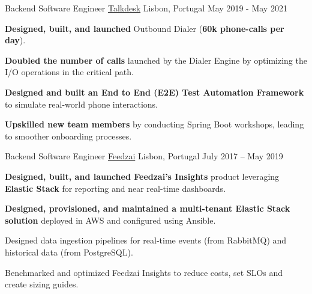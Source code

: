\begin{cventries}
  \cventry
    {Backend Software Engineer}
    {\href{https://www.talkdesk.com/}{Talkdesk}}
    {Lisbon, Portugal}
    {May 2019 - May 2021}
    {
      \begin{cvitems}
        \item \textbf{Designed, built, and launched} Outbound Dialer (\textbf{60k phone-calls per day}).
        \item \textbf{Doubled the number of calls} launched by the Dialer Engine by optimizing the I/O operations in the critical path.
        \item \textbf{Designed and built an End to End (E2E) Test Automation Framework} to simulate real-world phone interactions.
        \item \textbf{Upskilled new team members} by conducting Spring Boot workshops, leading to smoother onboarding processes.
      \end{cvitems}
      \vspace{4mm}
    }

    
  \cventry
    {Backend Software Engineer}
    {\href{https://feedzai.com/}{Feedzai}}
    {Lisbon, Portugal}
    {July 2017 – May 2019}
    {
      \begin{cvitems}
        \item \textbf{Designed, built, and launched Feedzai's Insights} product leveraging \textbf{Elastic Stack} for reporting and near real-time dashboards.
        \item \textbf{Designed, provisioned, and maintained a multi-tenant Elastic Stack solution} deployed in AWS and configured using Ansible.
        \item Designed data ingestion pipelines for real-time events (from RabbitMQ) and historical data (from PostgreSQL).
        \item Benchmarked and optimized Feedzai Insights to reduce costs, set SLOs and create sizing guides.
      \end{cvitems}
      \vspace{4mm}
    }


\end{cventries}
